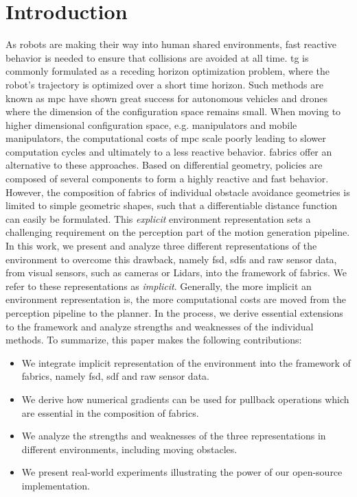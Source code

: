 \section{Introduction}
\label{sec:ral24_intro}
%
As robots are making their way into human shared environments,
fast reactive behavior is needed to ensure that collisions are avoided
at all time. \acf{tg} is commonly formulated as a receding
horizon optimization problem, where the robot's trajectory
is optimized over a short time horizon. Such methods are
known as \acf{mpc} have shown great success for autonomous
vehicles and drones where the dimension of the configuration
space remains small. When moving to higher dimensional
configuration space, e.g. manipulators and mobile
manipulators, the computational costs of \ac{mpc} scale
poorly leading to slower computation cycles and ultimately
to a less reactive behavior. \acf{fabrics} offer an
alternative to these approaches. Based on differential
geometry, policies are composed of several components to form a highly reactive
and fast behavior. However, the composition of \ac{fabrics} of
individual obstacle avoidance geometries is limited to simple geometric shapes,
such that a differentiable distance function can easily be
formulated. This \textit{explicit} environment
representation
sets a challenging requirement on the perception part of the motion generation
pipeline. In this work, we present and analyze three
different representations of the environment to 
overcome this drawback, namely \acf{fsd}, 
\acfp{sdf} and raw sensor data, from visual sensors, such as
cameras or Lidars, into the framework of
\ac{fabrics}. We refer to these representations as
\textit{implicit}.
Generally, the more implicit an environment representation is, the more
computational costs are moved from the perception pipeline to the planner.
In the process, we derive essential extensions to the framework and
analyze strengths and weaknesses of the individual methods. To summarize, this
paper makes the following contributions:
\begin{itemize}
  \item We integrate implicit representation of the environment into the
    framework of \ac{fabrics}, namely \ac{fsd}, \ac{sdf}
    and raw sensor data.
  \item We derive how numerical gradients can be used for pullback operations
    which are essential in the composition of \ac{fabrics}.
  \item We analyze the strengths and weaknesses of the three representations in
    different environments, including moving obstacles.
  \item We present real-world experiments illustrating the power of our
    open-source implementation.
\end{itemize}


